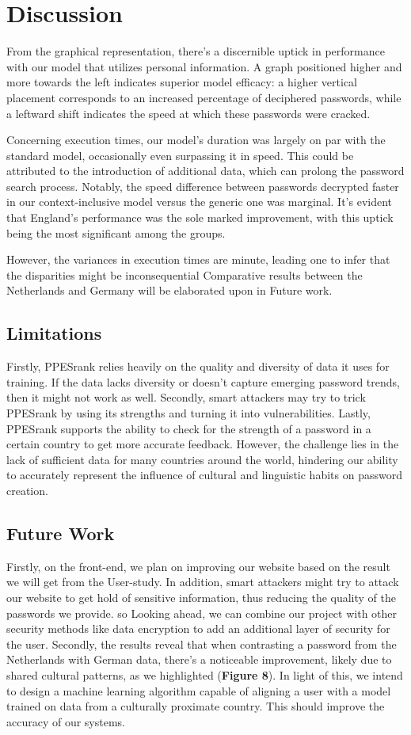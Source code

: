 \documentclass[5p,twocolumn]{elsarticle}
\begin{document}
\section{Discussion}
\label{Discussion}
From the graphical representation, there's a discernible uptick in performance with our model that utilizes personal information. A graph positioned higher and more towards the left indicates superior model efficacy: a higher vertical placement corresponds to an increased percentage of deciphered passwords, while a leftward shift indicates the speed at which these passwords were cracked.
 
Concerning execution times, our model's duration was largely on par with the standard model, occasionally even surpassing it in speed. This could be attributed to the introduction of additional data, which can prolong the password search process. Notably, the speed difference between passwords decrypted faster in our context-inclusive model versus the generic one was marginal. It's evident that England's performance was the sole marked improvement, with this uptick being the most significant among the groups.
 
However, the variances in execution times are minute, leading one to infer that the disparities might be inconsequential Comparative results between the Netherlands and Germany will be elaborated upon in Future work.
\subsection{\textbf{Limitations}}
Firstly, PPESrank relies heavily on the quality and diversity of data it uses for training. If the data lacks diversity or doesn't capture emerging password trends, then it might not work as well. Secondly, smart attackers may try to trick PPESrank by using its strengths and turning it into vulnerabilities. Lastly, PPESrank supports the ability to check for the strength of a password in a certain country to get more accurate feedback. However, the challenge lies in the lack of sufficient data for many countries around the world, hindering our ability to accurately represent the influence of cultural and linguistic habits on password creation.


\subsection{\textbf{Future Work}}
 Firstly, on the front-end, we plan on improving our website based on the result we will get from the User-study. In addition, smart attackers might try to attack our website to get hold of sensitive information, thus reducing the quality of the passwords we provide. so Looking ahead, we can combine our project with other security methods like data encryption to add an additional layer of security for the user. Secondly, the results reveal that when contrasting a password from the Netherlands with German data, there's a noticeable improvement, likely due to shared cultural patterns, as we highlighted (\textbf{Figure 8}). In light of this, we intend to design a machine learning algorithm capable of aligning a user with a model trained on data from a culturally proximate country. This should improve the accuracy of our systems. 
\end{document}
